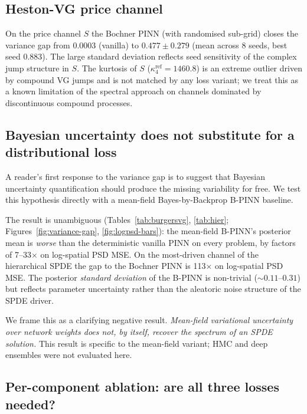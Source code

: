 \documentclass[10pt]{elsarticle}
\begin{document}
\subsection{Heston-VG price channel}

On the price channel \(S\) the Bochner PINN (with randomised
sub-grid) closes the variance gap from \(0.0003\) (vanilla) to
\(0.477 \pm 0.279\) (mean across 8 seeds, best seed 0.883). The
large standard deviation reflects seed sensitivity of the complex
jump structure in \(S\). The kurtosis of \(S\) (\(\kappa_4^{\mathrm{ref}}
= 1460.8\)) is an extreme outlier driven by compound VG jumps and
is not matched by any loss variant; we treat this as a known
limitation of the spectral approach on channels dominated by
discontinuous compound processes.

\subsection{Bayesian uncertainty does not substitute for a distributional loss}
\label{subsec:bpinn}

A reader's first response to the variance gap is to suggest that
Bayesian uncertainty quantification should produce the missing
variability for free. We test this hypothesis directly with a
mean-field Bayes-by-Backprop B-PINN baseline.

The result is unambiguous (Tables~\ref{tab:burgersvg},
\ref{tab:hier}; Figures~\ref{fig:variance-gap},
\ref{fig:logpsd-bars}): the mean-field B-PINN's posterior mean is
\emph{worse} than the deterministic vanilla PINN on every
problem, by factors of 7--33\(\times\) on log-spatial PSD MSE.
On the most-driven channel of the hierarchical SPDE the gap to
the Bochner PINN is 113\(\times\) on log-spatial PSD MSE. The
posterior \emph{standard deviation} of the B-PINN is non-trivial
(\(\sim 0.11\)--\(0.31\)) but reflects parameter uncertainty
rather than the aleatoric noise structure of the SPDE driver.

We frame this as a clarifying negative result. \emph{Mean-field
variational uncertainty over network weights does not, by itself,
recover the spectrum of an SPDE solution.} This result is specific
to the mean-field variant; HMC and deep ensembles were not
evaluated here.

\subsection{Per-component ablation: are all three losses needed?}
\label{subsec:ablation}
\end{document}
